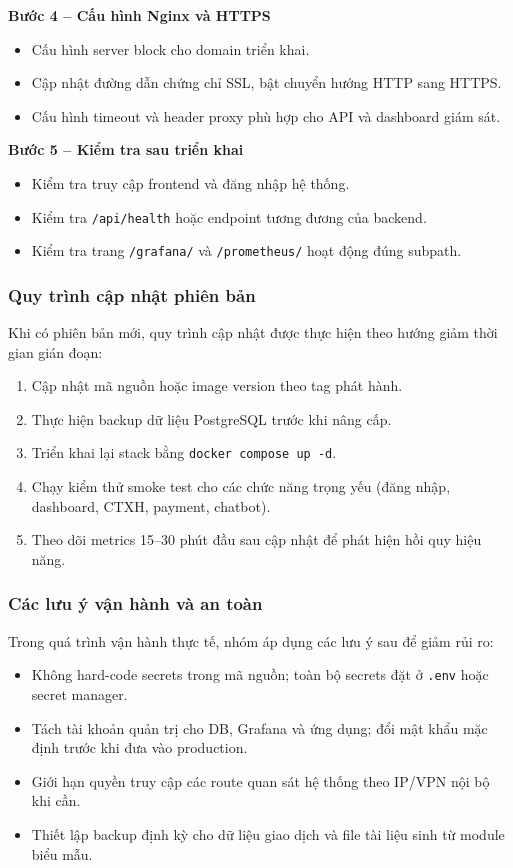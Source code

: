 \textbf{Bước 4 -- Cấu hình Nginx và HTTPS}
\begin{itemize}
	\item Cấu hình server block cho domain triển khai.
	\item Cập nhật đường dẫn chứng chỉ SSL, bật chuyển hướng HTTP sang HTTPS.
	\item Cấu hình timeout và header proxy phù hợp cho API và dashboard giám sát.
\end{itemize}

\textbf{Bước 5 -- Kiểm tra sau triển khai}
\begin{itemize}
	\item Kiểm tra truy cập frontend và đăng nhập hệ thống.
	\item Kiểm tra \texttt{/api/health} hoặc endpoint tương đương của backend.
	\item Kiểm tra trang \texttt{/grafana/} và \texttt{/prometheus/} hoạt động đúng subpath.
\end{itemize}

\subsubsection{Quy trình cập nhật phiên bản}
Khi có phiên bản mới, quy trình cập nhật được thực hiện theo hướng giảm thời gian gián đoạn:
\begin{enumerate}
	\item Cập nhật mã nguồn hoặc image version theo tag phát hành.
	\item Thực hiện backup dữ liệu PostgreSQL trước khi nâng cấp.
	\item Triển khai lại stack bằng \texttt{docker compose up -d}.
	\item Chạy kiểm thử smoke test cho các chức năng trọng yếu (đăng nhập, dashboard, CTXH, payment, chatbot).
	\item Theo dõi metrics 15--30 phút đầu sau cập nhật để phát hiện hồi quy hiệu năng.
\end{enumerate}

\subsubsection{Các lưu ý vận hành và an toàn}
Trong quá trình vận hành thực tế, nhóm áp dụng các lưu ý sau để giảm rủi ro:
\begin{itemize}
	\item Không hard-code secrets trong mã nguồn; toàn bộ secrets đặt ở \texttt{.env} hoặc secret manager.
	\item Tách tài khoản quản trị cho DB, Grafana và ứng dụng; đổi mật khẩu mặc định trước khi đưa vào production.
	\item Giới hạn quyền truy cập các route quan sát hệ thống theo IP/VPN nội bộ khi cần.
	\item Thiết lập backup định kỳ cho dữ liệu giao dịch và file tài liệu sinh từ module biểu mẫu.
\end{itemize}

